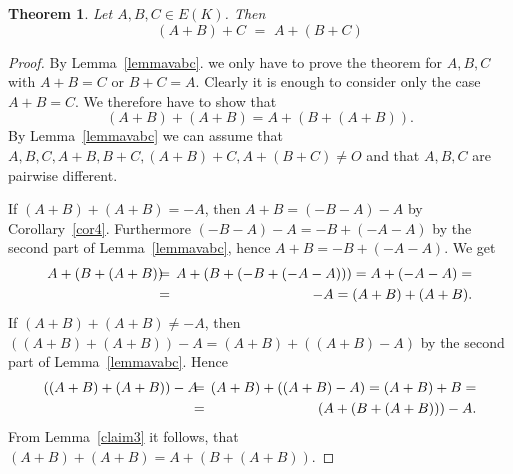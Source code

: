 \documentclass[12pt]{amsart}
\theoremstyle{plain}
\newtheorem{theorem}{Theorem}[section]
\theoremstyle{remark}
\theoremstyle{definition}
\begin{document}
\begin{theorem} \label{thmabc}
Let $A,B,C \in E(K)$. Then
\[ (A+B)+C\,\,=\,\,A+(B+C) \]
\end{theorem}

\begin{proof}
By
Lemma~\ref{lemmavabc}.
we only have to prove the theorem for $A,B,C$ with $A+B=C$ or $B+C=A$.
Clearly it is enough to consider only the case $A+B=C$.
We therefore have to show that
\[(A+B)+(A+B)=A+(B+(A+B)).\]
By Lemma~\ref{lemmavabc} we can assume that $A,B,C,A+B,B+C,(A+B)+C,A+(B+C) \neq  O$ and that 
$A,B,C$ are pairwise different.

If $(A+B)+(A+B)=-A$, then $A+B=(-B-A)-A$ by Corollary~\ref{cor4}.
Furthermore $(-B-A)-A=-B+(-A-A)$ by the second part of Lemma~\ref{lemmavabc}, hence
       $A+B=-B+(-A-A)$. We get
      \begin{eqnarray}
      A+(B+(A+B))&\hspace*{-0.2cm}=&\hspace*{-0.2cm}A+(B+(-B+(-A-A)))=A+(-A-A)= \nonumber \\
                 &\hspace*{-0.2cm}=&\hspace*{-0.2cm}-A=(A+B)+(A+B). \nonumber
      \end{eqnarray}
If $(A+B)+(A+B)\neq -A$, then $((A+B)+(A+B))-A=(A+B)+((A+B)-A)$ by
the second part of Lemma~\ref{lemmavabc}. Hence
      \begin{eqnarray}
      ((A+B)+(A+B))-A&\hspace*{-0.2cm}=&\hspace*{-0.2cm}(A+B)+((A+B)-A)=(A+B)+B= \nonumber \\
                     &\hspace*{-0.2cm}=&\hspace*{-0.2cm}(A+(B+(A+B)))-A. \nonumber
      \end{eqnarray}
      From Lemma~\ref{claim3} it follows, that $(A+B)+(A+B)=A+(B+(A+B))$.
\end{proof}
\end{document}
